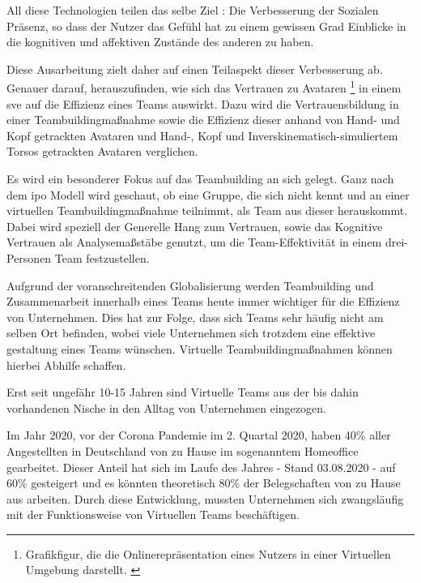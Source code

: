 \documentclass[a4paper,11pt]{article}%
\renewcommand{\\}{\vspace*{0.5\baselineskip} \newline}
\begin{document}
All diese Technologien teilen das selbe Ziel : \flqq Die Verbesserung der Sozialen Präsenz, so dass der Nutzer das Gefühl hat zu einem gewissen Grad Einblicke in die kognitiven und affektiven Zustände des anderen zu haben.\frqq \citep{biocca2002defining} \citep[p.407–447]{biocca2001plugging} \\
	
Diese Ausarbeitung zielt daher auf einen Teilaspekt dieser Verbesserung ab. Genauer darauf, herauszufinden, wie sich das Vertrauen zu Avataren \footnote{Grafikfigur, die die Onlinerepräsentation eines Nutzers in einer Virtuellen Umgebung darstellt. \citep[p.1]{neustaedter2009presenting}} in einem \ac{sve} auf die Effizienz eines Teams auswirkt. Dazu wird die Vertrauensbildung in einer Teambuildingmaßnahme sowie die Effizienz dieser anhand von Hand- und Kopf getrackten Avataren und Hand-, Kopf und Inverskinematisch-simuliertem Torsos getrackten Avataren verglichen.	

	Es wird ein besonderer Fokus auf das Teambuilding an sich gelegt. Ganz nach dem \ac{ipo} Modell wird geschaut, ob eine Gruppe, die sich nicht kennt und an einer virtuellen Teambuildingmaßnahme teilnimmt, als Team aus dieser herauskommt. Dabei wird speziell der Generelle Hang zum Vertrauen, sowie das Kognitive Vertrauen als Analysemaßstäbe genutzt, um die Team-Effektivität in einem drei-Personen Team festzustellen.
	
	Aufgrund der voranschreitenden Globalisierung werden Teambuilding und Zusammenarbeit innerhalb eines Teams heute immer wichtiger für die Effizienz von Unternehmen. Dies hat zur Folge, dass sich Teams sehr häufig nicht am selben Ort befinden, wobei viele Unternehmen sich trotzdem eine effektive gestaltung eines Teams wünschen.\citep[p.791-792]{jarvenpaa1999communication} Virtuelle Teambuildingmaßnahmen können hierbei Abhilfe schaffen. 
	
Erst seit ungefähr 10-15 Jahren sind Virtuelle Teams aus der bis dahin vorhandenen Nische in den Alltag von Unternehmen eingezogen. \citep{gilson2015virtual}

Im Jahr 2020, vor der Corona Pandemie im 2. Quartal 2020, haben 40\% aller Angestellten in Deutschland von zu Hause im sogenanntem Homeoffice gearbeitet. Dieser Anteil hat sich im Laufe des Jahres - Stand 03.08.2020 - auf 60\% gesteigert und es könnten theoretisch 80\% der Belegschaften von zu Hause aus arbeiten. \citep{statistaCorona2020} Durch diese Entwicklung, mussten Unternehmen sich zwangsläufig mit der Funktionsweise von Virtuellen Teams beschäftigen.
		
\end{document}

